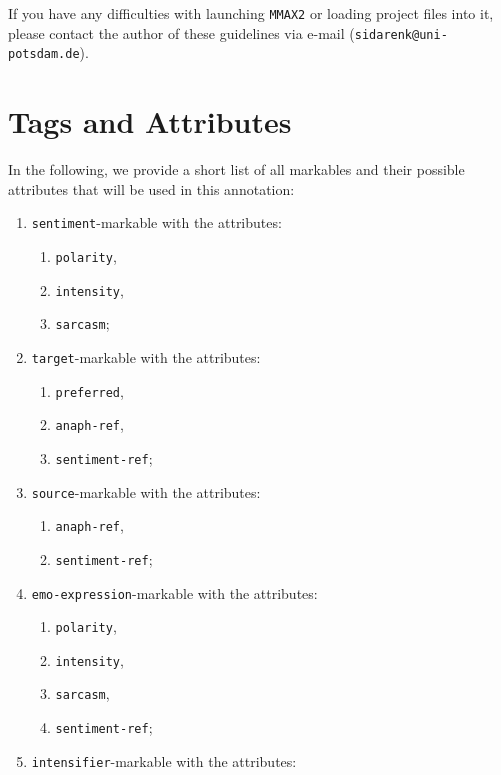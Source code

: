 \documentclass[11pt,a4paper]{article}
\makeatletter
\newcommand{\authorAddress}{\texttt{sidarenk@uni-potsdam.de}}
\theoremstyle{mytheoremstyle}
\makeatother
\begin{document}
If you have any difficulties with launching \texttt{MMAX2} or loading
project files into it, please contact the author of these guidelines
via e-mail (\authorAddress{}).


\section{Tags and Attributes}\label{sec:markables}
In the following, we provide a short list of all markables and their possible
attributes that will be used in this annotation:

\begin{multicols}{2}
  \begin{enumerate}
  \item \texttt{sentiment}-markable with the attributes:
    \begin{enumerate}
    \item \texttt{polarity},
    \item \texttt{intensity},
    \item \texttt{sarcasm};
    \end{enumerate}
  \item \texttt{target}-markable with the attributes:
    \begin{enumerate}
    \item \texttt{preferred},
    \item \texttt{anaph-ref},
    \item \texttt{sentiment-ref};
    \end{enumerate}
  \item \texttt{source}-markable with the attributes:
    \begin{enumerate}
    \item \texttt{anaph-ref},
    \item \texttt{sentiment-ref};
    \end{enumerate}
  \item \texttt{emo-expression}-markable with the attributes:
    \begin{enumerate}
    \item \texttt{polarity},
    \item \texttt{intensity},
    \item \texttt{sarcasm},
    \item \texttt{sentiment-ref};
    \end{enumerate}
  \item \texttt{intensifier}-markable with the attributes:

\end{enumerate}
\end{multicols}
\end{document}
